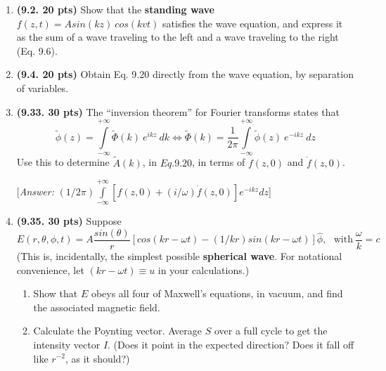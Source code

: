 \documentclass[fleqn]{article}
\begin{document}
  \begin{enumerate}
    \item \textbf{(9.2. 20 pts)} Show that the \textbf{standing wave} $f(z,t)=A sin(kz) ~ cos(kvt)$ satisfies
    the wave equation, and express it as the sum of a wave traveling to the left and a wave traveling to the 
    right (Eq. 9.6).


    \item \textbf{(9.4. 20 pts)} Obtain Eq. 9.20 directly from the wave equation, by separation of variables.


    \item \textbf{(9.33. 30 pts)} The “inversion theorem” for Fourier transforms states that
    $$
      \tilde{\phi}(z)=\int\limits_{-\infty}^{+\infty} \tilde{\Phi}(k) ~ e^{ikz} ~ dk 
      \Longleftrightarrow 
      \tilde{\Phi}(k)=\dfrac{1}{2 \pi} \int\limits_{-\infty}^{+\infty} \tilde{\phi}(z) ~ e^{-ikz} ~ dz 
    $$
    Use this to determine $\tilde{A}(k)$, in $Eq. 9.20$, in terms of $f(z, 0)$ and $\dot{f}(z,0)$.

    [\emph{Answer:} $(1/2 \pi) \int\limits_{-\infty}^{+\infty} \left[
      f(z, 0)+(i/\omega) \dot{f}(z,0)
    \right]e^{-ikz} dz$]


    \item \textbf{(9.35. 30 pts)} Suppose
    $$
      E(r, \theta, \phi, t)=A \dfrac{sin(\theta)}{r} \left[
        cos\left(kr-\omega t\right)-\left(1/kr\right) sin\left(kr-\omega t\right)
      \right] \hat{\phi}, ~~~ \text{with} ~ \dfrac{\omega}{k}=c
    $$
    (This is, incidentally, the simplest possible \textbf{spherical wave}. For notational convenience, 
    let $\left(kr-\omega t\right) \equiv u$ in your calculations.)
    \begin{enumerate}
      \item Show that $E$ obeys all four of Maxwell’s equations, in vacuum, and find the
      associated magnetic field.


      \item Calculate the Poynting vector. Average $S$ over a full cycle to get the intensity
      vector $I$. (Does it point in the expected direction? Does it fall off like $r^{−2}$, as it
      should?)


\end{enumerate}
\end{enumerate}
\end{document}
